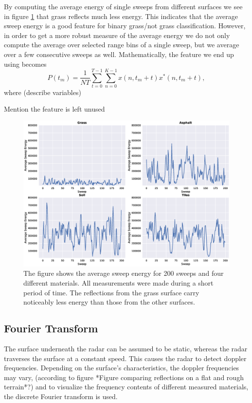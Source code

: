 By computing the average energy of single sweeps from different surfaces we see in figure \ref{fig:sweep_energy} that grass reflects much less energy. This indicates that the average sweep energy is a good feature for binary grass/not grass classification. However, in order to get a more robust measure of the average energy we do not only compute the average over selected range bins of a single sweep, but we average over a few consecutive sweeps as well. Mathematically, the feature we end up using becomes
\begin{equation}
	P(t_m) = \frac{1}{NT}\sum_{t=0}^{T-1}\sum_{n=0}^{K-1}x(n, t_m + t)x^*(n, t_m + t),
\end{equation}
where (describe variables)

Mention the feature is left unused

\begin{figure}[h]
	\centering
	\includegraphics[scale=0.45]{figs_temp/features/sweep_energy}
	\caption{The figure shows the average sweep energy for 200 sweeps and four different materials. All measurements were made during a short period of time. The reflections from the grass surface carry noticeably less energy than those from the other surfaces. }
	\label{fig:sweep_energy}
\end{figure}



\subsection{Fourier Transform}
The surface underneath the radar can be assumed to be static, whereas the radar traverses the surface at a constant speed. This causes the radar to detect doppler frequencies. Depending on the surface's characteristics, the doppler frequencies may vary, (according to figure *Figure comparing reflections on a flat and rough terrain*?) and to visualize the frequency contents of different measured materials, the discrete Fourier transform is used. 

